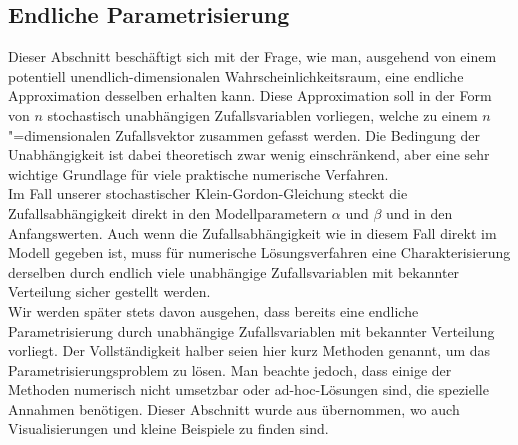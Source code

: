 \subsection{Endliche Parametrisierung}
\label{secfiniteparam}
Dieser Abschnitt beschäftigt sich mit der Frage, wie man, ausgehend von einem potentiell unendlich-dimensionalen Wahrscheinlichkeitsraum, eine endliche Approximation desselben erhalten kann. Diese Approximation soll in der Form von $n$ stochastisch unabhängigen Zufallsvariablen vorliegen, welche zu einem $n$"=dimensionalen Zufallsvektor zusammen gefasst werden. Die Bedingung der Unabhängigkeit ist dabei theoretisch zwar wenig einschränkend, aber eine sehr wichtige Grundlage für viele praktische numerische Verfahren.\\
Im Fall unserer stochastischer Klein-Gordon-Gleichung steckt die Zufallsabhängigkeit direkt in den Modellparametern $\alpha$ und $\beta$ und in den Anfangswerten. Auch wenn die Zufallsabhängigkeit wie in diesem Fall direkt im Modell gegeben ist, muss für numerische Lösungsverfahren eine Charakterisierung derselben durch endlich viele unabhängige Zufallsvariablen mit bekannter Verteilung sicher gestellt werden.\\
Wir werden später stets davon ausgehen, dass bereits eine endliche Parametrisierung durch unabhängige Zufallsvariablen mit bekannter Verteilung vorliegt. Der Vollständigkeit halber seien hier kurz Methoden genannt, um das Parametrisierungsproblem zu lösen. Man beachte jedoch, dass einige der Methoden numerisch nicht umsetzbar oder ad-hoc-Lösungen sind, die spezielle Annahmen benötigen. Dieser Abschnitt wurde aus \autocite[Kapitel 4.1+4.2]{dongbinxiu2010} übernommen, wo auch Visualisierungen und kleine Beispiele zu finden sind.

